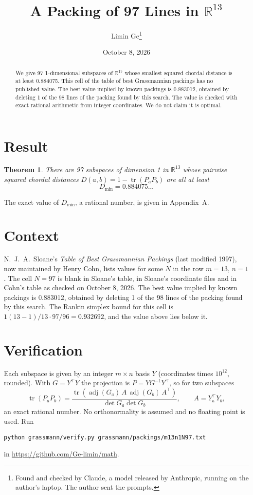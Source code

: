 \documentclass[11pt,a4paper]{article}
\title{A Packing of 97 Lines in $\mathbb{R}^{13}$}
\author{Limin Ge\thanks{Found and checked by Claude, a model released by Anthropic, running on the author's laptop. The author sent the prompts.}}
\date{October 8, 2026}
\newtheorem*{theorem}{Theorem}
\begin{document}
\maketitle
\begin{abstract}
We give 97 1-dimensional subspaces of $\mathbb{R}^{13}$ whose smallest squared chordal distance is at least 0.884075. This cell of the table of best Grassmannian packings has no published value. The best value implied by known packings is 0.883012, obtained by deleting 1 of the 98 lines of the packing found by this search. The value is checked with exact rational arithmetic from integer coordinates. We do not claim it is optimal.
\end{abstract}

\section{Result}
\begin{theorem}
There are 97 subspaces of dimension 1 in $\mathbb{R}^{13}$ whose pairwise squared chordal distances $D(a,b) = 1 - \operatorname{tr}(P_aP_b)$ are all at least
\[ D_{\min} = 0.884075\ldots \]
\end{theorem}
The exact value of $D_{\min}$, a rational number, is given in Appendix~A.


\section{Context}
N.~J.~A.~Sloane's \emph{Table of Best Grassmannian Packings} (last modified 1997), now maintained by Henry Cohn, lists values for some $N$ in the row $m=13$, $n=1$. The cell $N=97$ is blank in Sloane's table, in Sloane's coordinate files and in Cohn's table as checked on October 8, 2026. The best value implied by known packings is 0.883012, obtained by deleting 1 of the 98 lines of the packing found by this search. The Rankin simplex bound for this cell is $1(13-1)/13\cdot 97/96 = 0.932692$, and the value above lies below it.


\section{Verification}
Each subspace is given by an integer $m\times n$ basis $Y$ (coordinates times $10^{12}$, rounded). With $G=Y^\top Y$ the projection is $P=YG^{-1}Y^\top$, so for two subspaces
\[ \operatorname{tr}(P_aP_b)=\frac{\operatorname{tr}(\operatorname{adj}(G_a)\,A\,\operatorname{adj}(G_b)\,A^\top)}{\det G_a\det G_b},\qquad A=Y_a^\top Y_b, \]
an exact rational number. No orthonormality is assumed and no floating point is used. Run
\begin{verbatim}
python grassmann/verify.py grassmann/packings/m13n1N97.txt
\end{verbatim}
in \url{https://github.com/Ge-limin/math}.
\end{document}
